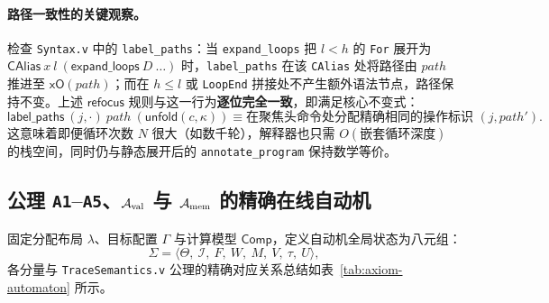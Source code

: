 \documentclass[UTF8,a4paper,11pt,fontset=fandol]{ctexart}
\newcommand{\code}[1]{\texttt{#1}}
\newcommand{\kw}[1]{\mathsf{#1}}
\begin{document}
\paragraph{路径一致性的关键观察。}
检查 \code{Syntax.v} 中的 \code{label\_paths}：当 \code{expand\_loops} 把 $l < h$ 的 \code{For} 展开为 $\kw{CAlias}\ x\ l\ (\kw{expand\_loops}\ D\ \dots)$ 时，\code{label\_paths} 在该 \code{CAlias} 处将路径由 $\mathit{path}$ 推进至 $\kw{xO}(\mathit{path})$；而在 $h \le l$ 或 \code{LoopEnd} 拼接处不产生额外语法节点，路径保持不变。上述 $\kw{refocus}$ 规则与这一行为\textbf{逐位完全一致}，即满足核心不变式：
\[
\kw{label\_paths}\ (j, \cdot)\ \mathit{path}\ (\kw{unfold}(c, \kappa))
\equiv \text{在聚焦头命令处分配精确相同的操作标识 } (j, \mathit{path}').
\]
这意味着即便循环次数 $N$ 很大（如数千轮），解释器也只需 $O(\text{嵌套循环深度})$ 的栈空间，同时仍与静态展开后的 \code{annotate\_program} 保持数学等价。

\subsection{公理 \texorpdfstring{\code{A1}--\code{A5}、$\mathcal A_{\rm val}$ 与 $\mathcal A_{\rm mem}$}{A1-A5, A\_val 与 A\_mem} 的精确在线自动机}
\label{sec:online-automaton}

固定分配布局 $\lambda$、目标配置 $\Gamma$ 与计算模型 $\mathsf{Comp}$，定义自动机全局状态为八元组：
\[
\Sigma = \langle \Theta,\ \mathcal I,\ F,\ W,\ M,\ V,\ \tau,\ U \rangle,
\]
各分量与 \code{TraceSemantics.v} 公理的精确对应关系总结如表~\ref{tab:axiom-automaton} 所示。
\end{document}
